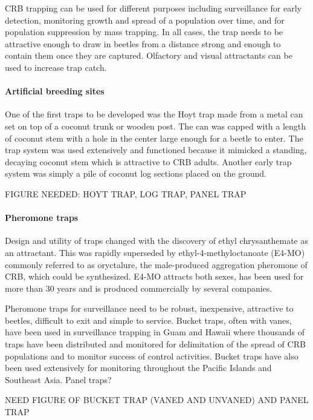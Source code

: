 \documentclass[twocolumn,letterpaper]{scrartcl}
\begin{document}
CRB trapping can be used for different purposes including surveillance for early detection, monitoring growth and spread of a population over time, and for population suppression by mass trapping. In all cases, the trap needs to be attractive enough to draw in beetles from a distance strong and enough to contain them once they are captured. Olfactory and visual attractants can be used to increase trap catch. 

\paragraph{Artificial breeding sites} One of the first traps to be developed was the Hoyt trap made from a metal can set on top of a coconut trunk or wooden post. The can was capped with a length of coconut stem with a hole in the center large enough for a beetle to enter. The trap system was used extensively and functioned because it mimicked a standing, decaying coconut stem which is attractive to CRB adults. Another early trap system was simply a pile of coconut log sections placed on the ground.

FIGURE NEEDED: HOYT TRAP, LOG TRAP, PANEL TRAP

\paragraph{Pheromone traps} Design and utility of traps changed with the discovery of ethyl chrysanthemate as an attractant. This was rapidly superseded by ethyl-4-methyloctanoate (E4-MO) commonly referred to as oryctalure, the male-produced aggregation pheromone of CRB, which could be synthesized. E4-MO attracts both sexes, has been used for more than 30 years and is produced commercially by several companies. 

Pheromone traps for surveillance need to be robust, inexpensive, attractive to beetles, difficult to exit and simple to service. Bucket traps, often with vanes, have been used in surveillance trapping in Guam and Hawaii where thousands of traps have been distributed and monitored for delimitation of the spread of CRB populations and to monitor success of control activities. Bucket traps have also been used extensively for monitoring throughout the Pacific Islands and Southeast Asia. Panel traps?

NEED FIGURE OF BUCKET TRAP (VANED AND UNVANED) AND PANEL TRAP
\end{document}
